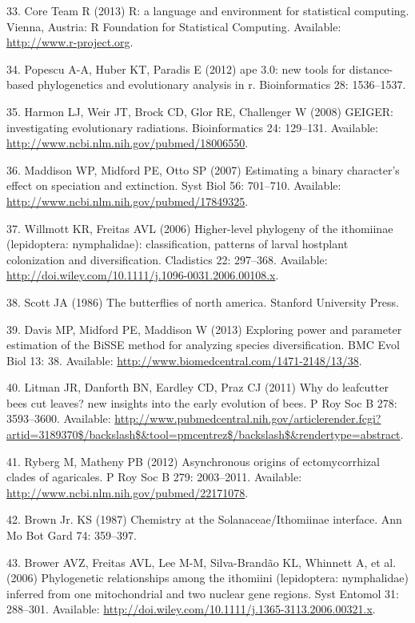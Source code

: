 \documentclass[10pt]{article}
\begin{document}
33. Core Team R (2013) R: a language and environment for statistical
computing. Vienna, Austria: R Foundation for Statistical Computing.
Available: \url{http://www.r-project.org}.

34. Popescu A-A, Huber KT, Paradis E (2012) ape 3.0: new tools for
distance-based phylogenetics and evolutionary analysis in r.
Bioinformatics 28: 1536--1537.

35. Harmon LJ, Weir JT, Brock CD, Glor RE, Challenger W (2008) GEIGER:
investigating evolutionary radiations. Bioinformatics 24: 129--131.
Available: \url{http://www.ncbi.nlm.nih.gov/pubmed/18006550}.

36. Maddison WP, Midford PE, Otto SP (2007) Estimating a binary
character's effect on speciation and extinction. Syst Biol 56: 701--710.
Available: \url{http://www.ncbi.nlm.nih.gov/pubmed/17849325}.

37. Willmott KR, Freitas AVL (2006) Higher-level phylogeny of the
ithomiinae (lepidoptera: nymphalidae): classification, patterns of
larval hostplant colonization and diversification. Cladistics 22:
297--368. Available:
\url{http://doi.wiley.com/10.1111/j.1096-0031.2006.00108.x}.

38. Scott JA (1986) The butterflies of north america. Stanford
University Press.

39. Davis MP, Midford PE, Maddison W (2013) Exploring power and
parameter estimation of the BiSSE method for analyzing species
diversification. BMC Evol Biol 13: 38. Available:
\url{http://www.biomedcentral.com/1471-2148/13/38}.

40. Litman JR, Danforth BN, Eardley CD, Praz CJ (2011) Why do leafcutter
bees cut leaves? new insights into the early evolution of bees. P Roy
Soc B 278: 3593--3600. Available:
\url{http://www.pubmedcentral.nih.gov/articlerender.fcgi?artid=3189370\$/backslash\$\&tool=pmcentrez\$/backslash\$\&rendertype=abstract}.

41. Ryberg M, Matheny PB (2012) Asynchronous origins of ectomycorrhizal
clades of agaricales. P Roy Soc B 279: 2003--2011. Available:
\url{http://www.ncbi.nlm.nih.gov/pubmed/22171078}.

42. Brown Jr. KS (1987) Chemistry at the Solanaceae/Ithomiinae
interface. Ann Mo Bot Gard 74: 359--397.

43. Brower AVZ, Freitas AVL, Lee M-M, Silva-Brandão KL, Whinnett A, et
al. (2006) Phylogenetic relationships among the ithomiini (lepidoptera:
nymphalidae) inferred from one mitochondrial and two nuclear gene
regions. Syst Entomol 31: 288--301. Available:
\url{http://doi.wiley.com/10.1111/j.1365-3113.2006.00321.x}.
\end{document}
